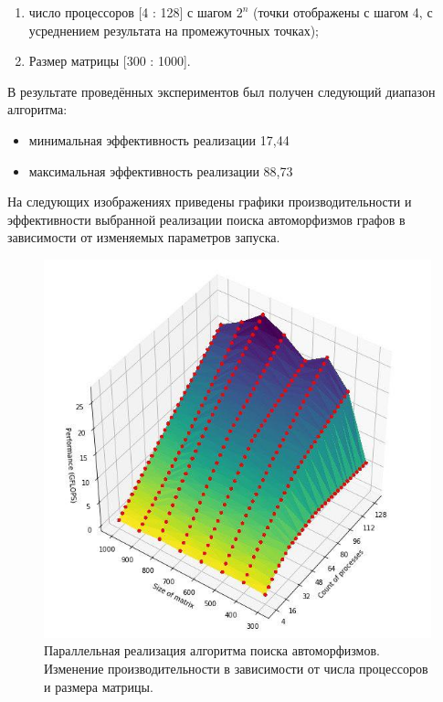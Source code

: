 \begin{enumerate}
\item число процессоров [4 : 128] с шагом $ 2^n$ (точки отображены с шагом 4, с усреднением результата на промежуточных точках);
\item Размер матрицы [300 : 1000].
\end{enumerate}

В результате проведённых экспериментов был получен следующий диапазон алгоритма:

\begin{itemize}
\item минимальная эффективность реализации 17,44%
\item максимальная эффективность реализации 88,73%
\end{itemize}

На следующих изображениях приведены графики производительности и эффективности выбранной реализации поиска автоморфизмов графов в зависимости от изменяемых параметров запуска.

\begin{figure}[ht]
\centering 
    \includegraphics[scale=0.8]{image/p.jpg}
    \caption{Параллельная реализация алгоритма поиска автоморфизмов. Изменение производительности в зависимости от числа процессоров и размера матрицы.}
    \label{srg}
\end{figure}

